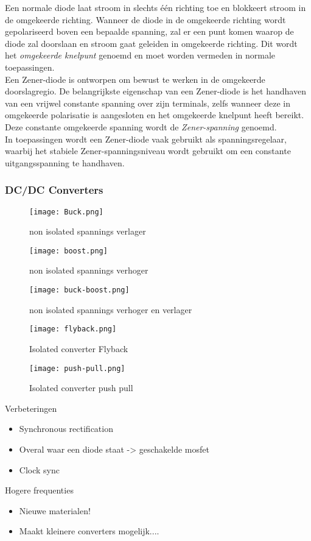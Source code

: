 Een normale diode laat stroom in slechts één richting toe en blokkeert stroom in de omgekeerde richting. Wanneer de diode in de omgekeerde richting wordt gepolariseerd boven een bepaalde spanning, zal er een punt komen waarop de diode zal doorslaan en stroom gaat geleiden in omgekeerde richting. Dit wordt het \textit{omgekeerde knelpunt} genoemd en moet worden vermeden in normale toepassingen.\\

Een Zener-diode is ontworpen om bewust te werken in de omgekeerde doorslagregio. De belangrijkste eigenschap van een Zener-diode is het handhaven van een vrijwel constante spanning over zijn terminals, zelfs wanneer deze in omgekeerde polarisatie is aangesloten en het omgekeerde knelpunt heeft bereikt. Deze constante omgekeerde spanning wordt de \textit{Zener-spanning} genoemd.\\

In toepassingen wordt een Zener-diode vaak gebruikt als spanningsregelaar, waarbij het stabiele Zener-spanningsniveau wordt gebruikt om een constante uitgangsspanning te handhaven.

\subsubsection*{DC/DC Converters}
\begin{figure}[H]
    \centering
    \texttt{[image: Buck.png]}
    \caption*{ non isolated spannings verlager}
    \end{figure}
\begin{figure}[H]
    \centering
    \texttt{[image: boost.png]}
    \caption*{ non isolated spannings verhoger}
    \end{figure}
\begin{figure}[H]
    \centering
    \texttt{[image: buck-boost.png]}
    \caption*{ non isolated spannings verhoger en verlager}
    \end{figure}
\begin{figure}[H]
    \centering
    \texttt{[image: flyback.png]}
    \caption*{ Isolated converter Flyback}
    \end{figure}
\begin{figure}[H]
    \centering
    \texttt{[image: push-pull.png]}
    \caption*{ Isolated converter push pull}
    \end{figure}


Verbeteringen
\begin{itemize}
    \item Synchronous rectification
    \item Overal waar een diode staat -> geschakelde mosfet
    \item Clock sync
\end{itemize}
Hogere frequenties
\begin{itemize}
    \item Nieuwe materialen!
    \item Maakt kleinere converters mogelijk....
\end{itemize}

